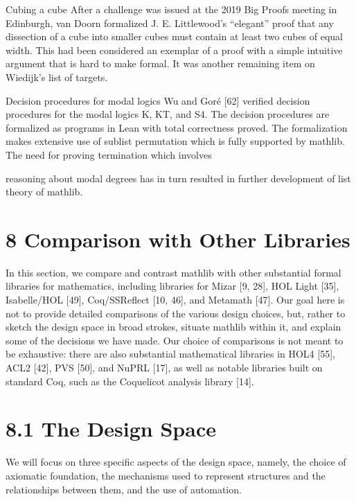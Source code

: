 \documentclass[
]{article}
\begin{document}
Cubing a cube After a challenge was issued at the 2019 Big Proofs
meeting in Edinburgh, van Doorn formalized J. E. Littlewood's
``elegant'' proof that any dissection of a cube into smaller cubes must
contain at least two cubes of equal width. This had been considered an
exemplar of a proof with a simple intuitive argument that is hard to
make formal. It was another remaining item on Wiedijk's list of targets.

Decision procedures for modal logics Wu and Goré {[}62{]} verified
decision procedures for the modal logics K, KT, and S4. The decision
procedures are formalized as programs in Lean with total correctness
proved. The formalization makes extensive use of sublist permutation
which is fully supported by mathlib. The need for proving termination
which involves

reasoning about modal degrees has in turn resulted in further
development of list theory of mathlib.

\section{8 Comparison with Other
Libraries}\label{comparison-with-other-libraries}

In this section, we compare and contrast mathlib with other substantial
formal libraries for mathematics, including libraries for Mizar {[}9,
28{]}, HOL Light {[}35{]}, Isabelle/HOL {[}49{]}, Coq/SSReflect {[}10,
46{]}, and Metamath {[}47{]}. Our goal here is not to provide detailed
comparisons of the various design choices, but, rather to sketch the
design space in broad strokes, situate mathlib within it, and explain
some of the decisions we have made. Our choice of comparisons is not
meant to be exhaustive: there are also substantial mathematical
libraries in HOL4 {[}55{]}, ACL2 {[}42{]}, PVS {[}50{]}, and NuPRL
{[}17{]}, as well as notable libraries built on standard Coq, such as
the Coquelicot analysis library {[}14{]}.

\section{8.1 The Design Space}\label{the-design-space}

We will focus on three specific aspects of the design space, namely, the
choice of axiomatic foundation, the mechanisms used to represent
structures and the relationships between them, and the use of
automation.
\end{document}
